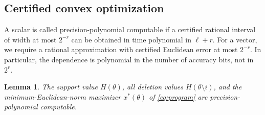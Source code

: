 \documentclass[11pt]{article}
\newtheorem{lemma}[theorem]{Lemma}
\begin{document}
\subsection{Certified convex optimization}

A scalar is called precision-polynomial computable if a certified
rational interval of width at most $2^{-r}$ can be obtained in
time polynomial in $\ell+r$.
For a vector, we require a rational approximation with certified
Euclidean error at most $2^{-r}$.
In particular, the dependence is polynomial in the number of
accuracy bits, not in $2^r$.

\begin{lemma}
\label{lem:certified-optimization}
The support value $H(\theta)$, all deletion values
$H(\theta\setminus i)$, and the minimum-Euclidean-norm maximizer
$x^*(\theta)$ of \eqref{eq:program} are precision-polynomial
computable.
\end{lemma}
\end{document}
